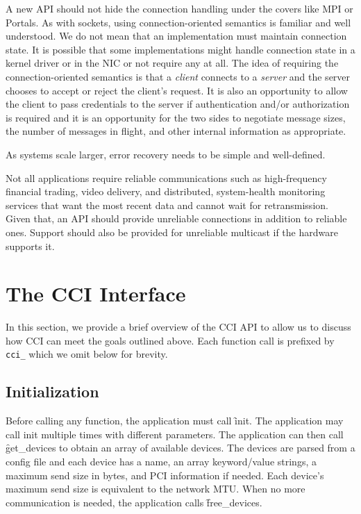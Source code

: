 \documentclass[conference]{IEEEtran}
\begin{document}
A new API should not hide the connection handling under the covers like MPI or Portals.
As with sockets, using connection-oriented semantics is familiar and well understood. We
do not mean that an implementation must maintain connection state. It is possible that
some implementations might handle connection state in a kernel driver or in the NIC or not
require any at all. The idea of requiring the connection-oriented semantics is that a
\emph{client} connects to a \emph{server} and the server chooses to accept or reject the
client's request. It is also an opportunity to allow the client to pass credentials to the
server if authentication and/or authorization is required and it is an opportunity for the
two sides to negotiate message sizes, the number of messages in flight, and other internal
information as appropriate.

As systems scale larger, error recovery needs to be simple and well-defined.

Not all applications require reliable communications such as high-frequency financial
trading, video delivery, and distributed, system-health monitoring services that want the
most recent data and cannot wait for retransmission. Given that, an API should provide
unreliable connections in addition to reliable ones. Support should also be provided for
unreliable multicast if the hardware supports it.

\section{The CCI Interface}
In this section, we provide a brief overview of the CCI API to allow us to discuss how CCI
can meet the goals outlined above. Each function call is prefixed by \texttt{cci\_} which
we omit below for brevity.

\subsection{Initialization}
Before calling any function, the application must call \f{init}. The application
may call init multiple times with different parameters. The application can then call
\f{get\_devices} to obtain an array of available devices. The devices are parsed
from a config file and each device has a name, an array keyword/value strings, a maximum
send size in bytes, and PCI information if needed. Each device's maximum send size is
equivalent to the network MTU. When no more communication is needed, the application calls
\f{free\_devices}.
\end{document}
